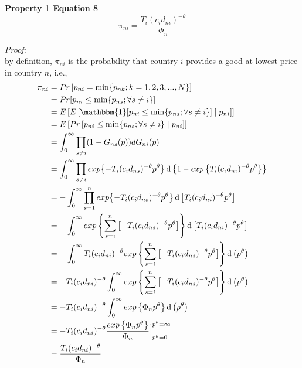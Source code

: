 \documentclass{article}
\newcommand*\diff{\mathop{}\!\mathrm{d}}
\begin{document}
\noindent\textbf{Property 1 Equation 8}
$$\pi_{ni} = \frac{T_i(c_i d_{ni})^{-\theta}}{\Phi_n}$$

\textit{Proof: }\\
by definition, $\pi_{ni}$ is the probability that country $i$ provides a good at lowest price in country $n$, i.e.,
\begin{equation*}
\begin{split}
    \pi_{ni} &=Pr\left[p_{ni}=\min\{p_{nk}; k = 1, 2, 3, ..., N\}\right]\\
    &=Pr[p_{ni}\leq\min\{p_{ns};\forall s \neq i\}]\\
    &=E\left[E\left[  \mathbbm{1}[p_{ni}\leq\min\{p_{ns};\forall s \neq i\}]\mid p_{ni}\right]\right]\\
    &=E\left[ Pr\left[ p_{ni}\leq\min\{p_{ns};\forall s \neq i\}\mid p_{ni}\right] \right]   \\
    &=\int_0^\infty \prod_{s\neq i}(1-G_{ns}(p))dG_{ni}(p)\\
    &=\int_0^\infty \prod_{s\neq i} exp{\left\{ -T_i (c_i d_{ns})^{-\theta} p^\theta \right\}} \diff \left\{1-exp\left\{T_i (c_i d_{ni})^{-\theta} p^\theta   \right\}\right\}\\
    &=-\int_0^\infty \prod_{s = 1}^{n} exp{\left\{ -T_i (c_i d_{ns})^{-\theta} p^\theta \right\}} \diff \left[T_i (c_i d_{ni})^{-\theta} p^\theta   \right]\\
    &=-\int_0^\infty exp\left\{  \sum_{s=i}^{n} \left[ -T_i (c_i d_{ns})^{-\theta} p^\theta \right] \right\} \diff \left[T_i (c_i d_{ni})^{-\theta} p^\theta   \right]\\
    &= -\int_0^\infty T_i (c_i d_{ni})^{-\theta}    exp\left\{  \sum_{s=i}^{n} \left[ -T_i (c_i d_{ns})^{-\theta} p^\theta \right] \right\} \diff \left(p^\theta   \right)\\
    &= -T_i (c_i d_{ni})^{-\theta} \int_0^\infty    exp\left\{  \sum_{s=i}^{n} \left[ -T_i (c_i d_{ns})^{-\theta} p^\theta \right] \right\} \diff \left(p^\theta   \right)\\
    &= -T_i (c_i d_{ni})^{-\theta} \int_0^\infty    exp\left\{  \Phi_n p^\theta  \right\} \diff \left(p^\theta   \right)\\
    &= -T_i (c_i d_{ni})^{-\theta} \frac{exp\left\{  \Phi_n p^\theta  \right\}}{\Phi_n} \Big|_{p^\theta = 0}^{p^\theta = \infty} \\
    &= \frac{T_i(c_i d_{ni})^{-\theta}}{\Phi_n}\\
\end{split}
\end{equation*}
\clearpage
\end{document}
